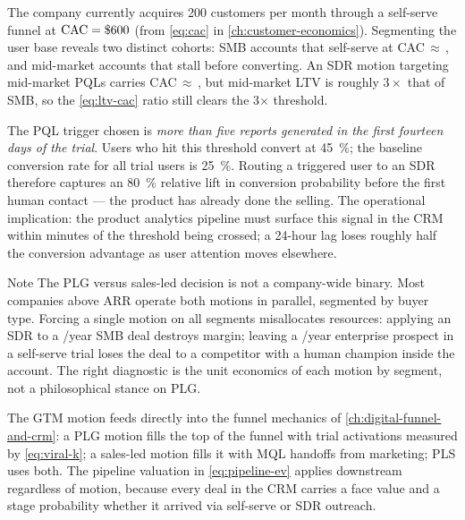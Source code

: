 \begin{example}
The company currently acquires \num{200} customers per month through a self-serve funnel at
\(\text{CAC} = \$\num{600}\) (from \cref{eq:cac} in \cref{ch:customer-economics}).
Segmenting the user base reveals two distinct cohorts: SMB accounts that self-serve at
CAC\,\(\approx\)\,, and mid-market accounts that stall before converting. An SDR
motion targeting mid-market PQLs carries CAC\,\(\approx\)\,, but mid-market LTV
is roughly \(3\times\) that of SMB, so the \cref{eq:ltv-cac} ratio still clears the
3\(\times\) threshold.

The PQL trigger chosen is \textit{more than five reports generated in the first fourteen
days of the trial}. Users who hit this threshold convert at \qty{45}{\percent}; the baseline
conversion rate for all trial users is \qty{25}{\percent}. Routing a triggered user to an
SDR therefore captures an \qty{80}{\percent} relative lift in conversion probability before
the first human contact --- the product has already done the selling. The operational
implication: the product analytics pipeline must surface this signal in the CRM within
minutes of the threshold being crossed; a 24-hour lag loses roughly half the conversion
advantage as user attention moves elsewhere.
\end{example}

\begin{admonition}{Note}
The PLG versus sales-led decision is not a company-wide binary. Most companies above 
ARR operate both motions in parallel, segmented by buyer type. Forcing a single motion on
all segments misallocates resources: applying an SDR to a /year SMB deal destroys
margin; leaving a /year enterprise prospect in a self-serve trial loses the deal to
a competitor with a human champion inside the account. The right diagnostic is the unit
economics of each motion by segment, not a philosophical stance on PLG.
\end{admonition}

The GTM motion feeds directly into the funnel mechanics of \cref{ch:digital-funnel-and-crm}:
a PLG motion fills the top of the funnel with trial activations measured by \cref{eq:viral-k};
a sales-led motion fills it with MQL handoffs from marketing; PLS uses both. The pipeline
valuation in \cref{eq:pipeline-ev} applies downstream regardless of motion, because
every deal in the CRM carries a face value and a stage probability whether it arrived via
self-serve or SDR outreach.


